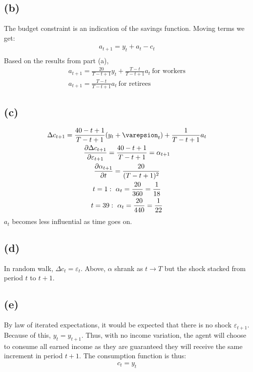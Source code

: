 \documentclass[10pt,a4paper]{article}
\begin{document}
    \subsection*{(b)}
      The budget constraint is an indication of the savings function. Moving terms we get:
      \begin{gather*}
        a_{t+1} = y_t + a_t - c_t \\
      \end{gather*}
      Based on the results from part (a),
      \begin{gather*}
        a_{t+1} = \frac{20}{T-t+1}y_t + \frac{T-t}{T-t+1}a_t \ \text{for workers} \\
        a_{t+1} = \frac{T-t}{T-t+1}a_{t} \ \text{for retirees}
      \end{gather*}
    \subsection*{(c)}
      \begin{gather*}
        \Delta c_{t+1} = \frac{40-t+1}{T-t+1}(y_t+\varepsion_t) + \frac{1}{T-t+1}a_{t} \\
        \frac{\partial\Delta c_{t+1}}{\partial\varepsilon_{t+1}} = \frac{40-t+1}{T-t+1} = \alpha_{t+1} \\
        \frac{\partial\alpha_{t+1}}{\partial t} = \frac{20}{(T-t+1)^2} \\
        t = 1: \ \alpha_t = \frac{20}{360} = \frac{1}{18} \\
        t = 39: \ \alpha_t = \frac{20}{440} = \frac{1}{22} \\
      \end{gather*}
      $a_t$ becomes less influential as time goes on. 
    \subsection*{(d)}
      In random walk, $\Delta c_t = \varepsilon_t$. Above, $\alpha$ shrank as $t \rightarrow T$ but the shock stacked from period $t$ to $t+1$.
    \subsection*{(e)}
      By law of iterated expectations, it would be expected that there is no shock $\varepsilon_{t+1}$. Because of this, $y_t = y_{t+1}$. Thus, with no income variation, the agent will choose to consume all earned income as they are guaranteed they will receive the same increment in period $t+1$. The consumption function is thus:
      \begin{gather*}
        c_t = y_t
      \end{gather*}
\end{document}
